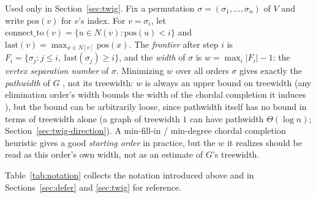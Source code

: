 \documentclass[ijoc,sglanonrev]{informs4}
\begin{document}
Used only in Section~\ref{sec:twig}. Fix a
permutation $\sigma=(\sigma_1,\dots,\sigma_n)$ of $V$ and write
$\mathrm{pos}(v)$ for $v$'s index. For $v=\sigma_i$, let
$\mathrm{connect\_to}(v)=\{u\in N(v):\mathrm{pos}(u)<i\}$ and
$\mathrm{last}(v)=\max_{x\in N[v]}\mathrm{pos}(x)$. The \emph{frontier}
after step $i$ is $F_i=\{\sigma_j:j\le i,\ \mathrm{last}(\sigma_j)\ge i\}$,
and the \emph{width} of $\sigma$ is $w=\max_i|F_i|-1$: the \emph{vertex
separation number} of $\sigma$. Minimizing $w$ over all orders $\sigma$
gives exactly the \emph{pathwidth} of $G$ \citep{kinnersley1992}, not its
treewidth: $w$ is always an upper bound on treewidth (any elimination
order's width bounds the width of the chordal completion it induces
\citep{bodlaender1988,cygan2015}), but the bound can be arbitrarily loose,
since pathwidth itself has no bound in terms of treewidth alone (a graph
of treewidth $1$ can have pathwidth $\Theta(\log n)$;
Section~\ref{sec:twig-direction}). A min-fill-in / min-degree chordal
completion heuristic \citep{bodlaender1988,cygan2015} gives a good
\emph{starting order} in practice, but the $w$ it realizes should be read
as this order's own width, not as an estimate of $G$'s treewidth.

Table~\ref{tab:notation} collects the notation introduced above and in
Sections~\ref{sec:defer} and \ref{sec:twig} for reference.
\end{document}
